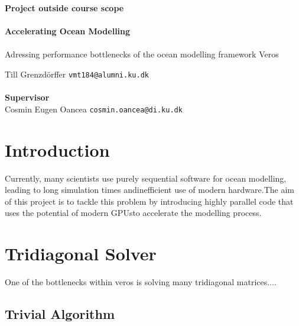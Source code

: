 \documentclass[a4paper,oneside]{memoir}
\begin{document}
    \thispagestyle{empty}
    \begin{adjustwidth}{-3cm}{-1.5cm}
    \vspace*{-1cm}
    \textbf{\Huge Project outside course scope} \\
    \vspace*{2.5cm} \\
    \textbf{\Huge Accelerating Ocean Modelling} \\
    \vspace*{.1cm} \\
    {\huge Adressing performance bottlenecks of the ocean modelling framework Veros} \\
    \begin{tabbing}
    Till Grenzdörffer \hspace{1cm} \= \texttt{vmt184@alumni.ku.dk} \\
    \\[12cm]
    \textbf{\Large Supervisor} \\
    Cosmin Eugen Oancea \> \texttt{cosmin.oancea@di.ku.dk} \\
    \end{tabbing}
    \end{adjustwidth}
    \newpage
    \ClearWallPaper



\section{Introduction}
Currently, many scientists use purely sequential software for ocean modelling, leading to long simulation times andinefficient use of modern hardware.The aim of this project is to tackle this problem by introducing highly parallel code that uses the potential of modern GPUsto accelerate the modelling process.
\section{Tridiagonal Solver}
One of the bottlenecks within veros is solving many tridiagonal matrices.... 
\subsection{Trivial Algorithm}
\end{document}
